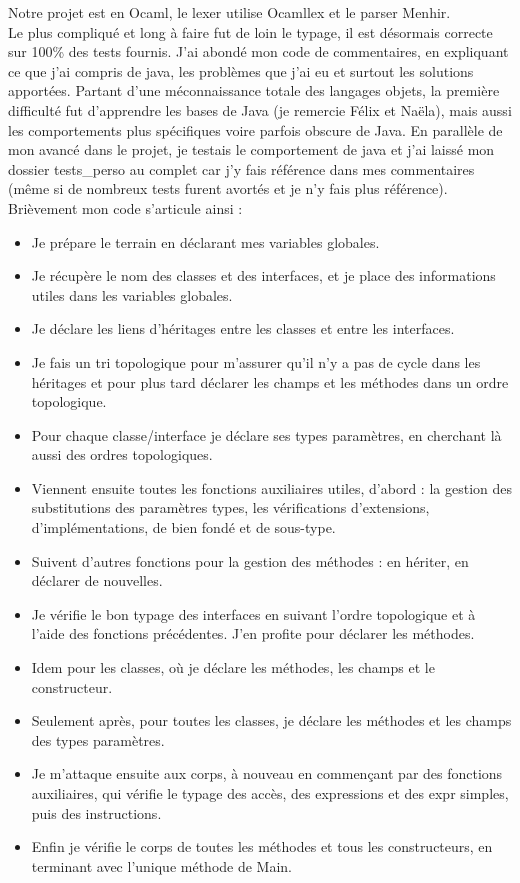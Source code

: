 \documentclass[12pt,a4paper]{report}
\begin{document}
Notre projet est en Ocaml, le lexer utilise Ocamllex et le parser Menhir. \\
Le plus compliqué et long à faire fut de loin le typage, il est désormais correcte sur 100\% des tests fournis. J'ai abondé mon code de commentaires, en expliquant ce que j'ai compris de java, les problèmes que j'ai eu et surtout les solutions apportées. Partant d'une méconnaissance totale des langages objets, la première difficulté fut d'apprendre les bases de Java (je remercie Félix et Naëla), mais aussi les comportements plus spécifiques voire parfois obscure de Java. En parallèle de mon avancé dans le projet, je testais le comportement de java et j'ai laissé mon dossier tests\_perso au complet car j'y fais référence dans mes commentaires (même si de nombreux tests furent avortés et je n'y fais plus référence). Brièvement mon code s'articule ainsi :
\begin{itemize}
\item Je prépare le terrain en déclarant mes variables globales.
\item Je récupère le nom des classes et des interfaces, et je place des informations utiles dans les variables globales.
\item Je déclare les liens d'héritages entre les classes et entre les interfaces.
\item Je fais un tri topologique pour m'assurer qu'il n'y a pas de cycle dans les héritages et pour plus tard déclarer les champs et les méthodes dans un ordre topologique. 
\item Pour chaque classe/interface je déclare ses types paramètres, en cherchant là aussi des ordres topologiques.
\item Viennent ensuite toutes les fonctions auxiliaires utiles, d'abord : la gestion des substitutions des paramètres types, les vérifications d'extensions, d'implémentations, de bien fondé et de sous-type. 
\item Suivent d'autres fonctions pour la gestion des méthodes : en hériter, en déclarer de nouvelles. 
\item Je vérifie le bon typage des interfaces en suivant l'ordre topologique et à l'aide des fonctions précédentes. J'en profite pour déclarer les méthodes.
\item Idem pour les classes, où je déclare les méthodes, les champs et le constructeur.
\item Seulement après, pour toutes les classes, je déclare les méthodes et les champs des types paramètres.
\item Je m'attaque ensuite aux corps, à nouveau en commençant par des fonctions auxiliaires, qui vérifie le typage des accès, des expressions et des expr simples, puis des instructions.
\item Enfin je vérifie le corps de toutes les méthodes et tous les constructeurs, en terminant avec l'unique méthode de Main.
\end{itemize}
\end{document}
